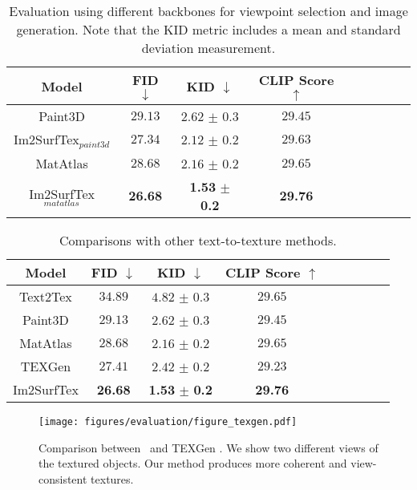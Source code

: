 \begin{table}[!t]
    \centering
    \begin{tabular}{c|cccccccc}
        \toprule
         \textbf{Model} & \textbf{FID} $\downarrow$ & \textbf{KID} $\downarrow$ & \textbf{CLIP Score} 
         $\uparrow$  \\ 
         \midrule
        Paint3D & $29.13$ & $2.62$ $\pm$ $0.3$ & $29.45$ \\ 
        Im2SurfTex$_{paint3d}$ & \textbf{$27.34$} & \textbf{$2.12$} $\pm$ \textbf{$0.2$} & \textbf{$29.63$} \\
         \midrule
        MatAtlas & $28.68$ & $2.16$ $\pm$ $0.2$ & $29.65$ \\
        Im2SurfTex$_{matatlas}$ & \textbf{26.68} & \textbf{1.53} $\pm$ \textbf{0.2} & \textbf{29.76} \\
        \bottomrule
    \end{tabular}
    \caption{Evaluation using different backbones for viewpoint selection and image generation. Note that the KID metric includes a mean and standard deviation measurement.}
    \label{tab:ablation_backbones}
    \vspace*{-1mm}
\end{table}

\begin{table}[!t]
    \centering
    \begin{tabular}{c|cccccccc}
        \toprule
         \textbf{Model} & \textbf{FID} $\downarrow$ & \textbf{KID} $\downarrow$ & \textbf{CLIP Score} 
         $\uparrow$ \\ 
         \midrule
        Text2Tex & $34.89$ & $4.82$ $\pm$ $0.3$ & $29.65$  \\ 
        Paint3D & $29.13$ & $2.62$ $\pm$ $0.3$ & $29.45$ &  \\ 
        MatAtlas & $28.68$ & $2.16$ $\pm$ $0.2$ & $29.65$ \\
        TEXGen & $27.41$ & $2.42$ $\pm$ $0.2$ & $29.23$ \\
        Im2SurfTex & \textbf{26.68} & \textbf{1.53} $\pm$ \textbf{0.2} & \textbf{29.76} \\
        \bottomrule
    \end{tabular}
    \caption{Comparisons with other text-to-texture methods.}
    \label{tab:comparisons_t2t}
    \vspace*{-1mm}
\end{table}

\begin{figure}[!t]
    \texttt{[image: figures/evaluation/figure\_texgen.pdf]}
    \caption{Comparison between \method \ and TEXGen \cite{Yu:2024:TEXGen}. We show  two different views of the textured objects. Our method produces more coherent and view-consistent textures.}
    \label{fig:texgencomparison}
    \vspace*{-4mm}
\end{figure}


